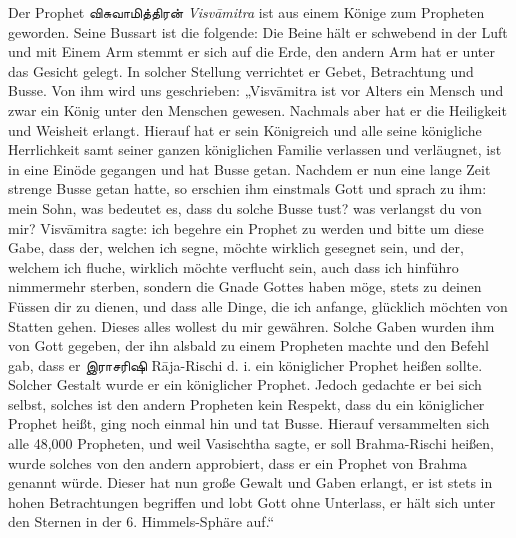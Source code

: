 \documentclass{article}
\newcommand{\TamilText}[1]{\texttamil{#1}}
\newcommand{\tam}[1]{\TamilText{#1}}
\begin{document}
Der Prophet \tam{விசுவாமித்திரன்} \emph{Visv\={a}mitra} ist aus einem Könige zum Propheten geworden. Seine Bussart ist die folgende: Die Beine hält er schwebend in der Luft und mit Einem Arm stemmt er sich auf die Erde, den andern Arm hat er unter das Gesicht gelegt. In solcher Stellung verrichtet er Gebet, Betrachtung und Busse. Von ihm wird uns geschrieben: „Visv\={a}mitra ist vor Alters ein Mensch und zwar ein König unter den Menschen gewesen. Nachmals aber hat er die Heiligkeit und Weisheit erlangt. Hierauf hat er sein Königreich und alle seine königliche Herrlichkeit samt seiner ganzen königlichen Familie verlassen und verläugnet, ist in eine Einöde gegangen und hat Busse getan. Nachdem er nun eine lange Zeit strenge Busse getan hatte, so erschien ihm einstmals Gott und sprach zu ihm: mein Sohn, was bedeutet es, dass du solche Busse tust? was verlangst du von mir? Visv\={a}mitra sagte: ich begehre ein Prophet zu werden und bitte um diese Gabe, dass der, welchen ich segne, möchte wirklich gesegnet sein, und der, welchem ich fluche, wirklich möchte verflucht sein, auch dass ich hinführo nimmermehr sterben, sondern die Gnade Gottes haben möge, stets zu deinen Füssen dir zu dienen, und dass alle Dinge, die ich anfange, glücklich möchten von Statten gehen. Dieses alles wollest du mir gewähren. Solche Gaben wurden ihm von Gott gegeben, der ihn alsbald zu einem Propheten machte und den Befehl gab, dass er \tam{இராசரிஷி} R\={a}ja-Rischi d. i. ein königlicher Prophet heißen sollte. Solcher Gestalt wurde er ein königlicher Prophet. Jedoch gedachte er bei sich selbst, solches ist den andern Propheten kein Respekt, dass du ein königlicher Prophet heißt, ging noch einmal hin und tat Busse. Hierauf versammelten sich alle 48,000 Propheten, und weil Vasischtha sagte, er soll Brahma-Rischi heißen, wurde solches von den andern approbiert, dass er ein Prophet von Brahma genannt würde. Dieser hat nun große Gewalt und Gaben erlangt, er ist stets in hohen Betrachtungen begriffen und lobt Gott ohne Unterlass, er hält sich unter den Sternen in der 6. Himmels-Sphäre auf.“
\end{document}
